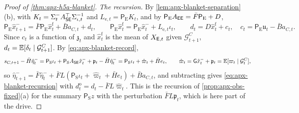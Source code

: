 \begin{proof}[Proof of \cref{thm:apx-h5a-blanket}]
\emph{The recursion.} By \cref{lem:apx-blanket-separation}(b), with $K_t=\Sigma^-_tA_{\mathsf{S}\mathsf{E}}^\top\Sigma_{\iota,t}^{-1}$ and $L_{\mathrm e,t}=\mathsf P_{\mathrm E}K_t$, and by $\mathsf P_{\mathrm E}A_{\mathsf{E}\mathsf{E}}=\bar F\mathsf P_{\mathrm E}+D$,
\begin{equation*}
\mathsf P_{\mathrm E}\hat x^-_{t+1}=\bar F\mathsf P_{\mathrm E}\hat x^{\mathrm f}_t+\bar Ba_{C,t}+d_t,\qquad\mathsf P_{\mathrm E}\hat x^{\mathrm f}_t=\mathsf P_{\mathrm E}\hat x^-_t+L_{\mathrm e,t}\iota_t,\qquad d_t=D\hat x^{\mathrm f}_t+c_t,\quad c_t=\mathsf P_{\mathrm E}\mathfrak u_t-\bar Ba_{C,t} .
\end{equation*}
Since $c_t$ is a function of $\mathfrak z_t$ and $\hat x^{\mathrm f}_t$ is the mean of $X_{\mathsf{E},t}$ given $\mathcal G^C_{t+1}$, $d_t=\mathbb{E}[\delta_t\mid\mathcal G^C_{t+1}]$. By \eqref{eq:apx-blanket-record},
\begin{equation*}
s_{C,t+1}-\bar H\hat\eta^-_t=\mathsf P_{\mathrm S}\iota_t+\mathsf P_{\mathrm S}A_{\mathsf{S}\mathsf{E}}\hat x^-_t+\mathfrak p_t-\bar H\hat\eta^-_t=\mathsf P_{\mathrm S}\iota_t+\hat\varpi_t+\bar He_t,\qquad\hat\varpi_t=\mathsf G\hat x^-_t+\mathfrak p_t=\mathbb{E}[\varpi_t\mid\mathcal G^C_t] ,
\end{equation*}
so $\hat\eta^-_{t+1}=\bar F\hat\eta^-_t+\bar FL(\mathsf P_{\mathrm S}\iota_t+\hat\varpi_t+\bar He_t)+\bar Ba_{C,t}$, and subtracting gives \eqref{eq:apx-blanket-recursion} with $d^{\mathrm o}_t=d_t-\bar FL\hat\varpi_t$. This is the recursion of \cref{prop:apx-obs-fixed}(a) for the summary $\mathsf P_{\mathrm S}z$ with the perturbation $\bar FL\mathfrak p_t$, which is here part of the drive.


\end{proof}
